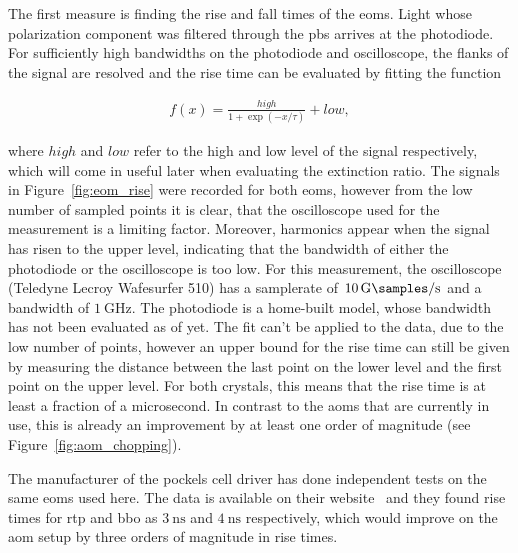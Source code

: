 The first measure is finding the rise and fall times of the \acp{eom}. Light whose polarization component was filtered through the \ac{pbs} arrives at the photodiode. For sufficiently high bandwidths on the photodiode and oscilloscope, the flanks of the signal are resolved and the rise time can be evaluated by fitting the function

\begin{align}
	f(x) = \frac{high}{1 + \exp{(-x/\tau)}} + low,
\end{align}

where $high$ and $low$ refer to the high and low level of the signal respectively, which will come in useful later when evaluating the extinction ratio. The signals in Figure~\ref{fig:eom_rise} were recorded for both \acp{eom}, however from the low number of sampled points it is clear, that the oscilloscope used for the measurement is a limiting factor. Moreover, harmonics appear when the signal has risen to the upper level, indicating that the bandwidth of either the photodiode or the oscilloscope is too low. For this measurement, the oscilloscope (Teledyne Lecroy Wafesurfer 510) has a samplerate of $\SI{10}{\giga\samples\per\second}$ and a bandwidth of $\SI{1}{\giga\hertz}$. The photodiode is a home-built model, whose bandwidth has not been evaluated as of yet. The fit can't be applied to the data, due to the low number of points, however an upper bound for the rise time can still be given by measuring the distance between the last point on the lower level and the first point on the upper level. For both crystals, this means that the rise time is at least a fraction of a microsecond. In contrast to the \acp{aom} that are currently in use, this is already an improvement by at least one order of magnitude (see Figure~\ref{fig:aom_chopping}).

The manufacturer of the pockels cell driver has done independent tests on the same \acp{eom} used here. The data is available on their website~\cite{Bergmann2020} and they found rise times for \ac{rtp} and \ac{bbo} as $\SI{3}{\nano\second}$ and $\SI{4}{\nano\second}$ respectively, which would improve on the \ac{aom} setup by three orders of magnitude in rise times.
\begin{figure}[t]%
\end{figure}

